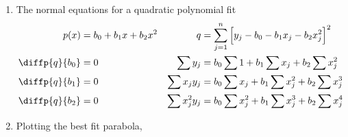 \begin{enumerate}
    \item The normal equations for a quadratic polynomial fit
          \begin{align}
              p(x)            & = b_0 + b_1x + b_2x^2                              &
              q               & = \sum_{j=1}^{n} \Big[ y_j - b_0 - b_1x_j
              - b_2x_j^2 \Big]^2                                                     \\
              \diffp {q}{b_0} & = 0                                                &
              \sum y_j        & = b_0 \sum 1 + b_1 \sum x_j + b_2 \sum x_j^2         \\
              \diffp {q}{b_1} & = 0                                                &
              \sum x_j y_j    & = b_0 \sum x_j + b_1 \sum x_j^2 + b_2 \sum x_j^3     \\
              \diffp {q}{b_2} & = 0                                                &
              \sum x_j^2 y_j  & = b_0 \sum x_j^2 + b_1 \sum x_j^3 + b_2 \sum x_j^4
          \end{align}

    \item Plotting the best fit parabola,
          \begin{figure}[H]
              \centering
              \anitableeight
          \end{figure}


\end{enumerate}
